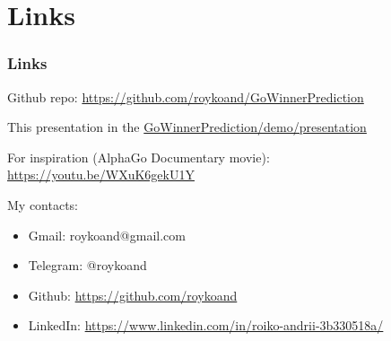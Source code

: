 \documentclass{beamer}
\begin{document}
\section{Links}
\begin{frame}
\frametitle{Links}

Github repo: \url{https://github.com/roykoand/GoWinnerPrediction}

This presentation in the \url{GoWinnerPrediction/demo/presentation}

For inspiration (AlphaGo Documentary movie): \url{https://youtu.be/WXuK6gekU1Y}
\end{frame}



\begin{frame}
My contacts:
\begin{itemize}
\frametitle{The end :)}

\item Gmail: roykoand@gmail.com
\item Telegram: @roykoand
\item Github: \url{https://github.com/roykoand}
\item LinkedIn: \url{https://www.linkedin.com/in/roiko-andrii-3b330518a/}

\end{itemize}
\end{frame}

\end{document}
